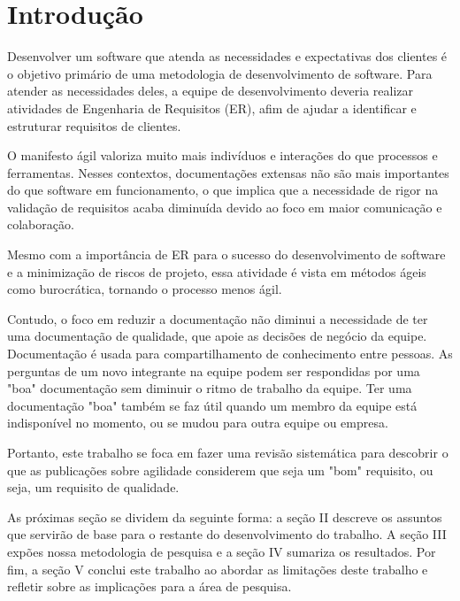 \section{Introdução}

Desenvolver um software que atenda as necessidades e expectativas dos clientes é o objetivo primário de uma metodologia de desenvolvimento de software. Para atender as necessidades deles, a equipe de desenvolvimento deveria realizar atividades de Engenharia de Requisitos (ER), afim de ajudar a identificar e estruturar requisitos de clientes. \cite{Best_Practices_Guidelines_2014}

O manifesto ágil \cite{Agile_Manifesto_2001} valoriza muito mais indivíduos e interações do que processos e ferramentas. Nesses contextos, documentações extensas não são mais importantes do que software em funcionamento, o que implica que a necessidade de rigor na validação de requisitos acaba diminuída devido ao foco em maior comunicação e colaboração.

Mesmo com a importância de ER para o sucesso do desenvolvimento de software e a minimização de riscos de projeto, essa atividade é vista em métodos ágeis como burocrática, tornando o processo menos ágil. \cite{Medeiros_2015}

Contudo, o foco em reduzir a documentação não diminui a necessidade de ter uma documentação de qualidade, que apoie as decisões de negócio da equipe. Documentação é usada para compartilhamento de conhecimento entre pessoas. As perguntas de um novo integrante na equipe podem ser respondidas por uma "boa" documentação sem diminuir o ritmo de trabalho da equipe. Ter uma documentação "boa" também se faz útil quando um membro da equipe está indisponível no momento, ou se mudou para outra equipe ou empresa. \cite{Paetsch_2003}

Portanto, este trabalho se foca em fazer uma revisão sistemática para descobrir o que as publicações sobre agilidade considerem que seja um "bom" requisito, ou seja, um requisito de qualidade. 

As próximas seção se dividem da seguinte forma: a seção II descreve os assuntos que servirão de base para o restante do desenvolvimento do trabalho. A seção III expões nossa metodologia de pesquisa e a seção IV sumariza os resultados. Por fim, a seção V conclui este trabalho ao abordar as limitações deste trabalho e refletir sobre as implicações para a área de pesquisa.

